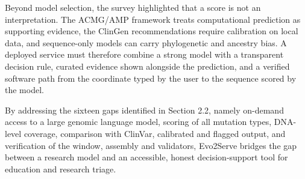 Beyond model selection, the survey highlighted that a score is not an interpretation. The ACMG/AMP framework treats computational prediction as supporting evidence, the ClinGen recommendations require calibration on local data, and sequence-only models can carry phylogenetic and ancestry bias. A deployed service must therefore combine a strong model with a transparent decision rule, curated evidence shown alongside the prediction, and a verified software path from the coordinate typed by the user to the sequence scored by the model.

By addressing the sixteen gaps identified in Section 2.2, namely on-demand access to a large genomic language model, scoring of all mutation types, DNA-level coverage, comparison with ClinVar, calibrated and flagged output, and verification of the window, assembly and validators, Evo2Serve bridges the gap between a research model and an accessible, honest decision-support tool for education and research triage.
